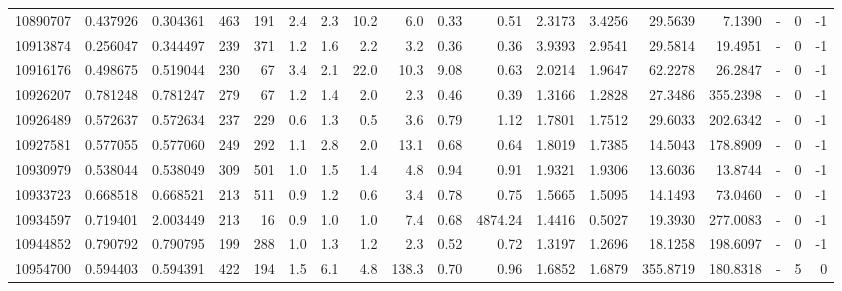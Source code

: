 \begin{tabular}{rrrrrrrrrrrrrrrlrr}
  10890707 & 0.437926 &   0.304361 &  463 &  191 &      2.4 &      2.3 &    10.2 &      6.0 &       0.33 &        0.51 &  2.3173 &  3.4256 &   29.5639 &    7.1390 &             - &        0 &         -1 \\
  10913874 & 0.256047 &   0.344497 &  239 &  371 &      1.2 &      1.6 &     2.2 &      3.2 &       0.36 &        0.36 &  3.9393 &  2.9541 &   29.5814 &   19.4951 &             - &        0 &         -1 \\
  10916176 & 0.498675 &   0.519044 &  230 &   67 &      3.4 &      2.1 &    22.0 &     10.3 &       9.08 &        0.63 &  2.0214 &  1.9647 &   62.2278 &   26.2847 &             - &        0 &         -1 \\
  10926207 & 0.781248 &   0.781247 &  279 &   67 &      1.2 &      1.4 &     2.0 &      2.3 &       0.46 &        0.39 &  1.3166 &  1.2828 &   27.3486 &  355.2398 &             - &        0 &         -1 \\
  10926489 & 0.572637 &   0.572634 &  237 &  229 &      0.6 &      1.3 &     0.5 &      3.6 &       0.79 &        1.12 &  1.7801 &  1.7512 &   29.6033 &  202.6342 &             - &        0 &         -1 \\
  10927581 & 0.577055 &   0.577060 &  249 &  292 &      1.1 &      2.8 &     2.0 &     13.1 &       0.68 &        0.64 &  1.8019 &  1.7385 &   14.5043 &  178.8909 &             - &        0 &         -1 \\
  10930979 & 0.538044 &   0.538049 &  309 &  501 &      1.0 &      1.5 &     1.4 &      4.8 &       0.94 &        0.91 &  1.9321 &  1.9306 &   13.6036 &   13.8744 &             - &        0 &         -1 \\
  10933723 & 0.668518 &   0.668521 &  213 &  511 &      0.9 &      1.2 &     0.6 &      3.4 &       0.78 &        0.75 &  1.5665 &  1.5095 &   14.1493 &   73.0460 &             - &        0 &         -1 \\
  10934597 & 0.719401 &   2.003449 &  213 &   16 &      0.9 &      1.0 &     1.0 &      7.4 &       0.68 &     4874.24 &  1.4416 &  0.5027 &   19.3930 &  277.0083 &             - &        0 &         -1 \\
  10944852 & 0.790792 &   0.790795 &  199 &  288 &      1.0 &      1.3 &     1.2 &      2.3 &       0.52 &        0.72 &  1.3197 &  1.2696 &   18.1258 &  198.6097 &             - &        0 &         -1 \\
  10954700 & 0.594403 &   0.594391 &  422 &  194 &      1.5 &      6.1 &     4.8 &    138.3 &       0.70 &        0.96 &  1.6852 &  1.6879 &  355.8719 &  180.8318 &             - &        5 &          0 \\

\end{tabular}
